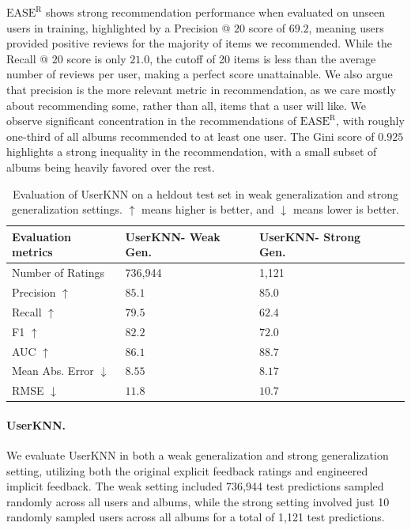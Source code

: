 \documentclass{article}
\newcommand{\easer}{$\text{EASE}^\text{R}$\xspace}
\newcommand{\userknn}{UserKNN\xspace}
\begin{document}
\easer shows strong recommendation performance when evaluated on unseen users
in training, highlighted by a Precision @ $20$ score of $69.2$, meaning users
provided
positive reviews for the majority of items we recommended.
While the Recall @ $20$ score is only $21.0$, the cutoff of 20 items is less
 than the average number of reviews per user, making a perfect score
 unattainable.
We also argue that precision is the more relevant metric in recommendation, as
 we care mostly about recommending some, rather than all, items that a user will
 like.
We observe significant concentration in the recommendations of \easer, with
 roughly one-third of all albums recommended to at least one user.
The Gini score of $0.925$ highlights a strong inequality in the recommendation,
 with a small subset of albums being heavily favored over the rest.

\begin{table}[h]
\centering
\begin{tabular}{@{}llll@{}}
\toprule
Evaluation metrics    & \userknn - Weak Gen. & \userknn -
Strong Gen.
\\ \midrule
Number of Ratings			  & 736,944
& 1,121 \\
Precision $\uparrow$	      & $85.1$		     & $85.0$
\\
Recall	$\uparrow$		& $79.5$	       & $62.4$
\\
F1	$\uparrow$		    & $82.2$		   &
$72.0$
\\
AUC $\uparrow$					& $86.1$
& $88.7$
\\
Mean Abs.
Error $\downarrow$	   & $8.55$		& $8.17$ \\ RMSE $\downarrow$ &
 $11.8$		&$10.7$ \\ \bottomrule \end{tabular} \caption{Evaluation of
 \userknn on a heldout test set in weak generalization and strong generalization
 settings.
$\uparrow$ means
higher is better, and $\downarrow$
means lower is better.}
\label{tab:userknn-results}

\end{table}

\paragraph*{\userknn.}
We evaluate \userknn in both a weak generalization and strong generalization
 setting, utilizing both the original explicit feedback ratings and engineered
 implicit feedback.
The weak setting included 736,944 test predictions sampled randomly across all
 users and albums, while the strong setting involved just 10 randomly sampled
 users across all albums for a total of 1,121 test predictions.
\end{document}
